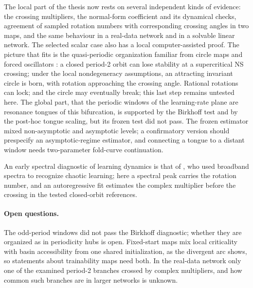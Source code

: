 \documentclass[11pt,letterpaper]{article}
\begin{document}
The local part of the thesis now rests on several independent kinds of evidence: the crossing multipliers, the
normal-form coefficient and its dynamical checks, agreement of sampled rotation numbers with corresponding
crossing angles in two maps, and the same behaviour in a real-data network and in a solvable linear network. The selected scalar
case also has a local computer-assisted proof. The picture that fits is
the quasi-periodic organization familiar from circle maps and forced oscillators
\citep{curry1978,aronson1982,jensen1984}: a closed period-2 orbit can lose stability at a
supercritical NS crossing; under the local nondegeneracy assumptions, an attracting invariant circle is born,
with rotation approaching the crossing angle. Rational rotations can lock; and the circle may eventually break; this last step remains untested here. The global part, that the periodic windows of the learning-rate
plane are resonance tongues of this bifurcation, is supported by the Birkhoff test and by the post-hoc tongue
scaling, but its frozen test did not pass. The frozen estimator mixed non-asymptotic and asymptotic levels; a
confirmatory version should prespecify an asymptotic-regime estimator, and connecting a tongue to a distant window
needs two-parameter fold-curve continuation.

An early spectral diagnostic of learning dynamics is that of \citet{vandermaas1990}, who used
broadband spectra to recognize chaotic learning; here a spectral peak carries the rotation number, and an
autoregressive fit estimates the complex multiplier before the crossing in the tested closed-orbit references.

\paragraph{Open questions.} The odd-period windows did not pass the Birkhoff diagnostic; whether they are organized
as in periodicity hubs \citep{jones2012} is open. Fixed-start maps mix local criticality with basin accessibility
from one shared initialization, as the divergent arc shows, so statements about trainability maps need both. In the
real-data network only one of the examined period-2 branches crossed by complex multipliers, and how common such
branches are in larger networks is unknown.
\end{document}
